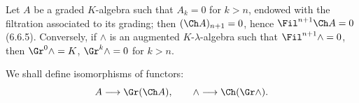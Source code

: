 Let \(A\) be a graded \(K\)-algebra such that \(A_k=0\) for \(k>n\), endowed with the filtration associated to its grading; then \((\Ch A)_{n+1}=0\), hence \(\Fil^{n+1}\Ch A=0\) (6.6.5). Conversely, if \(\mathord{\wedge}\) is an augmented \(K\)-\(\lambda\)-algebra such that \(\Fil^{n+1}\mathord{\wedge}=0\), then \(\Gr^0\mathord{\wedge}=K\), \(\Gr^k\mathord{\wedge}=0\) for \(k>n\).

We shall define isomorphisms of functors:
\[
  A\longrightarrow \Gr(\Ch A),
  \qquad
  \mathord{\wedge}\longrightarrow \Ch(\Gr\mathord{\wedge}).
\]

